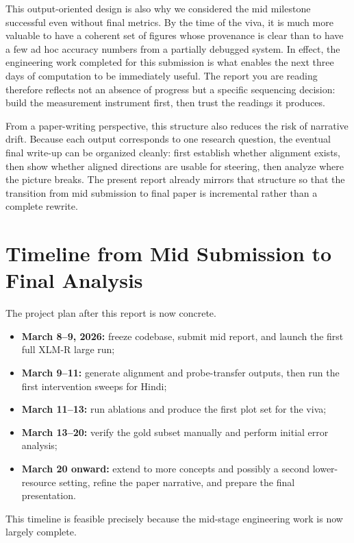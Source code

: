 \documentclass[11pt]{article}
\newcommand{\modelmain}{XLM-R large\xspace}
\begin{document}
This output-oriented design is also why we considered the mid milestone successful even without final metrics. By the time of the viva, it is much more valuable to have a coherent set of figures whose provenance is clear than to have a few ad hoc accuracy numbers from a partially debugged system. In effect, the engineering work completed for this submission is what enables the next three days of computation to be immediately useful. The report you are reading therefore reflects not an absence of progress but a specific sequencing decision: build the measurement instrument first, then trust the readings it produces.

From a paper-writing perspective, this structure also reduces the risk of narrative drift. Because each output corresponds to one research question, the eventual final write-up can be organized cleanly: first establish whether alignment exists, then show whether aligned directions are usable for steering, then analyze where the picture breaks. The present report already mirrors that structure so that the transition from mid submission to final paper is incremental rather than a complete rewrite.

\section{Timeline from Mid Submission to Final Analysis}
The project plan after this report is now concrete.
\begin{itemize}[leftmargin=*,itemsep=2pt]
    \item \textbf{March 8--9, 2026:} freeze codebase, submit mid report, and launch the first full \modelmain run;
    \item \textbf{March 9--11:} generate alignment and probe-transfer outputs, then run the first intervention sweeps for Hindi;
    \item \textbf{March 11--13:} run ablations and produce the first plot set for the viva;
    \item \textbf{March 13--20:} verify the gold subset manually and perform initial error analysis;
    \item \textbf{March 20 onward:} extend to more concepts and possibly a second lower-resource setting, refine the paper narrative, and prepare the final presentation.
\end{itemize}

This timeline is feasible precisely because the mid-stage engineering work is now largely complete.
\end{document}
